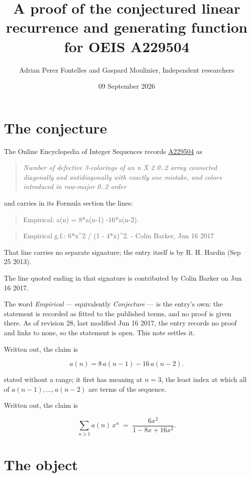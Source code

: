 \documentclass[11pt]{article}
\title{A proof of the conjectured linear recurrence and generating function for OEIS A229504}
\author{Adrian Perez Fontelles and Gaspard Moulinier, Independent researchers}
\date{09 September 2026}
\theoremstyle{definition}
\begin{document}
\maketitle
\section{The conjecture}

The Online Encyclopedia of Integer Sequences records \href{https://oeis.org/A229504}{A229504} as

\begin{quote}\itshape Number of defective 3-colorings of an n X 2 0..2 array connected diagonally and antidiagonally with exactly one mistake, and colors introduced in row-major 0..2 order\end{quote}

and carries in its Formula section the lines:

\begin{quote}\ttfamily Empirical: a(n) = 8*a(n-1) -16*a(n-2).\end{quote}

\begin{quote}\ttfamily Empirical g.f.: 6*x\textasciicircum{}2 / (1 - 4*x)\textasciicircum{}2. - Colin Barker, Jun 16 2017\end{quote}

That line carries no separate signature; the entry itself is by R. H. Hardin (Sep 25 2013).

The line quoted ending in that signature is contributed by Colin Barker on Jun 16 2017.

The word {\itshape Empirical} --- equivalently {\itshape Conjecture} --- is the entry's own: the statement is recorded as fitted to the published terms, and no proof is given there. As of revision 28, last modified Jun 16 2017, the entry records no proof and links to none, so the statement is open. This note settles it.

Written out, the claim is

\[a(n) = 8\,a(n-1) - 16\,a(n-2).\]

stated without a range; it first has meaning at $n = 3$, the least index at which all of $a(n-1),\dots,a(n-2)$ are terms of the sequence.

Written out, the claim is

\[\sum_{n \ge 1} a(n)\,x^n \;=\; \frac{6x^{2}}{1 - 8x + 16x^{2}}.\]

\section{The object}
\end{document}
